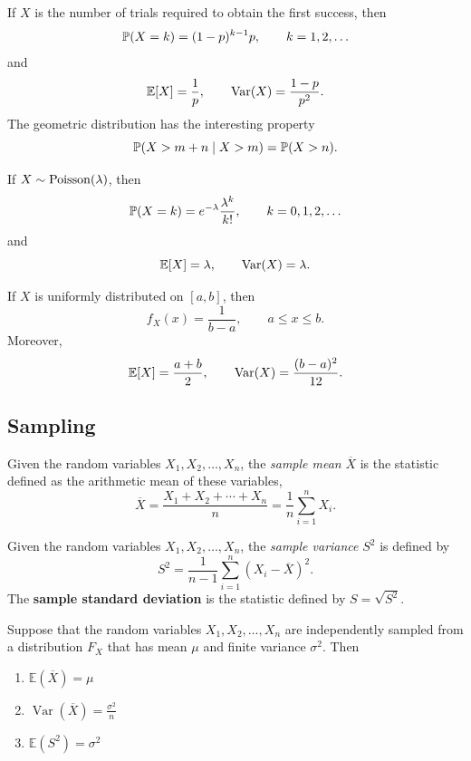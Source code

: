 \begin{example}
If $X$ is the number of trials required to obtain the first success, then
\[
\mathbb{P}(X=k)=(1-p)^{k-1}p, \qquad k=1,2,\ldots
\]
and
\[
\mathbb{E}[X]=\frac1p,
\qquad
\operatorname{Var}(X)=\frac{1-p}{p^2}.
\]
The geometric distribution has the interesting property
\[
\mathbb{P}(X>m+n\mid X>m) = \mathbb{P}(X>n).
\]
\end{example}

\begin{example}
If $X\sim\operatorname{Poisson}(\lambda)$, then
\[
\mathbb{P}(X=k) = e^{-\lambda}\frac{\lambda^k}{k!}, \qquad
k=0,1,2,\ldots
\]
and
\[
\mathbb{E}[X]=\lambda,
\qquad
\operatorname{Var}(X)=\lambda.
\]
\end{example}

\begin{example}
If $X$ is uniformly distributed on $[a,b]$, then
\[
f_X(x)
=
\frac{1}{b-a},
\qquad
a\leq x\leq b.
\]
Moreover,
\[
\mathbb{E}[X]=\frac{a+b}{2}, \qquad \operatorname{Var}(X)
=
\frac{(b-a)^2}{12}.
\]
\end{example}


\subsection{Sampling}

\begin{df}
Given the random variables $X_1,X_2,\ldots,X_n$, the \emph{sample mean} $\overline{X}$ is the statistic defined as the arithmetic mean of these variables,
\[
\overline{X}
=
\frac{X_1+X_2+\cdots+X_n}{n}
=
\frac{1}{n}\sum_{i=1}^{n}X_i.
\]
\end{df}

\begin{df}
Given the random variables $X_1,X_2,\ldots,X_n$, the \emph{sample variance} $S^2$ is defined by
\[
S^2
=
\frac{1}{n-1}\sum_{i=1}^{n}
\left(X_i-\overline{X}\right)^2.
\]
The \textbf{sample standard deviation} is the statistic defined by $S=\sqrt{S^2}$.
\end{df}

\begin{proposition}
Suppose that the random variables $X_1,X_2,\ldots,X_n$ are independently sampled from a distribution $F_X$ that has mean $\mu$ and finite variance $\sigma^2$. Then
\begin{enumerate}
\item $\mathbb{E}\left(\overline{X}\right)=\mu$
\item $\operatorname{Var}\left(\overline{X}\right)=\frac{\sigma^2}{n}$
\item $\mathbb{E}\left(S^2\right)=\sigma^2$
\end{enumerate}
\end{proposition}

